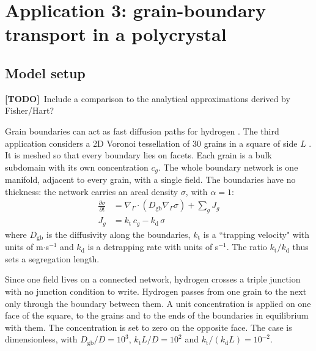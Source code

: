 \documentclass[5p]{elsarticle}
\newcommand{\gradG}{\nabla_{\Gamma}}  %
\newcommand{\TODO}[1]{\textcolor{BrickRed}{\textbf{[TODO]}~#1}}
\begin{document}
\section{Application 3: grain-boundary transport in a polycrystal}
\label{sec:app:gb}

\subsection{Model setup}
\label{sec:app:gb:setup}
\TODO{Include a comparison to the analytical approximations derived by Fisher/Hart?}

Grain boundaries can act as fast diffusion paths for hydrogen \cite{fisher_grain_boundary_1951, diaz-rodriguez_direct_2022}. 
The third application considers a 2D Voronoi tessellation of 30 grains in a square of side $L$ \cite{virtanen_scipy_2020}.
It is meshed so that every boundary lies on facets.
Each grain is a bulk subdomain with its own concentration $c_g$.
The whole boundary network is one manifold, adjacent to every grain, with a single field.
The boundaries have no thickness: the network carries an areal density $\sigma$, with $\alpha = 1$:
\begin{equation}
    \begin{aligned}
        \frac{\partial \sigma}{\partial t} &= \gradG \cdot \left( D_\mathrm{gb} \gradG \sigma \right) + \sum_g J_g \\
        J_g &= k_\mathrm{t}\, c_g - k_\mathrm{d}\, \sigma
    \end{aligned}
    \label{eq:gb}
\end{equation}
where $D_\mathrm{gb}$ is the diffusivity along the boundaries, $k_\mathrm{t}$ is a ``trapping velocity" with units of m$\cdot$s$^{-1}$ and $k_\mathrm{d}$ is a detrapping rate with units of s$^{-1}$.
The ratio $k_\mathrm{t}/k_\mathrm{d}$ thus sets a segregation length.

Since one field lives on a connected network, hydrogen crosses a triple junction with no junction condition to write.
Hydrogen passes from one grain to the next only through the boundary between them.
A unit concentration is applied on one face of the square, to the grains and to the ends of the boundaries in equilibrium with them.
The concentration is set to zero on the opposite face.
The case is dimensionless, with $D_\mathrm{gb}/D = 10^{3}$, $k_\mathrm{t} L / D = 10^{2}$ and $k_\mathrm{t}/(k_\mathrm{d} L) = 10^{-2}$.
\end{document}

